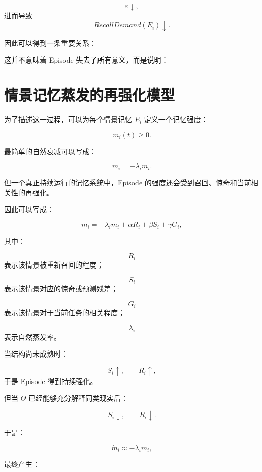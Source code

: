 \[
\varepsilon\downarrow,
\]
进而导致
\[
RecallDemand(E_i)\downarrow.
\]

因此可以得到一条重要关系：

\begin{statementbox}
\centering
{}
\end{statementbox}

这并不意味着 Episode 失去了所有意义，而是说明：

\begin{statementbox}
\centering
{}
\end{statementbox}

\section{情景记忆蒸发的再强化模型}

为了描述这一过程，可以为每个情景记忆 $E_i$ 定义一个记忆强度：

\[
m_i(t)\geq 0.
\]

最简单的自然衰减可以写成：

\[
\dot m_i
=
-\lambda_i m_i.
\]

但一个真正持续运行的记忆系统中，Episode 的强度还会受到召回、惊奇和当前相关性的再强化。

因此可以写成：

\[
\boxed{
\dot m_i
=
-\lambda_i m_i
+
\alpha R_i
+
\beta S_i
+
\gamma G_i,
}
\]

其中：

\[
R_i
\]
表示该情景被重新召回的程度；

\[
S_i
\]
表示该情景对应的惊奇或预测残差；

\[
G_i
\]
表示该情景对于当前任务的相关程度；

\[
\lambda_i
\]
表示自然蒸发率。

当结构尚未成熟时：

\[
S_i\uparrow,
\qquad
R_i\uparrow,
\]
于是 Episode 得到持续强化。

但当 $\Theta$ 已经能够充分解释同类现实后：

\[
S_i\downarrow,
\qquad
R_i\downarrow.
\]

于是：

\[
\dot m_i
\approx
-\lambda_i m_i,
\]

最终产生：

